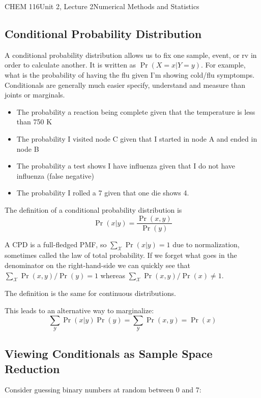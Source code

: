 \documentclass{article}
\begin{document}
\begin{tdoc}{CHEM 116}{Unit 2, Lecture 2}{Numerical Methods and Statistics}
\subsection{Conditional Probability Distribution}
A conditional probability distribution allows us to fix one sample,
event, or rv in order to calculate another. It is written as
$\Pr(X=x|Y=y)$. For example, what is the probability of having the flu
given I'm showing cold/flu symptomps. Conditionals are generally much
easier specify, understand and measure than joints or marginals.

\begin{itemize}

\item The probability a reaction being complete given that the temperature is less than 750 K
\item The probability I visited node C given that I started in node A and ended in node B
\item The probability a test shows I have influenza given that I do not have influenza (false negative)
\item The probability I rolled a 7 given that one die shows 4.

\end{itemize}

The definition of a conditional probability distribution is
\begin{equation}
\Pr(x|y) = \frac{\Pr(x,y)}{\Pr(y)}
\end{equation}

A CPD is a full-fledged PMF, so $\sum_\mathcal{X} \Pr(x|y) = 1$ due to
normalization, sometimes called the law of total probability.  If we
forget what goes in the denominator on the right-hand-side we can
quickly see that $\sum_\mathcal{X} \Pr(x,y) / \Pr(y) = 1$ whereas
$\sum_\mathcal{X} \Pr(x,y) / \Pr(x) \neq 1$.

The definition is the same for continuous distributions.

This leads to an alternative way to marginalize:
\[
\sum_\mathcal{Y} \Pr(x|y) \Pr(y) = \sum_\mathcal{Y} \Pr(x,y) = \Pr(x)
\]


\subsection{Viewing Conditionals as Sample Space Reduction}

Consider guessing binary numbers at random between 0 and 7:\vspace{0.25cm}


\end{tdoc}
\end{document}
